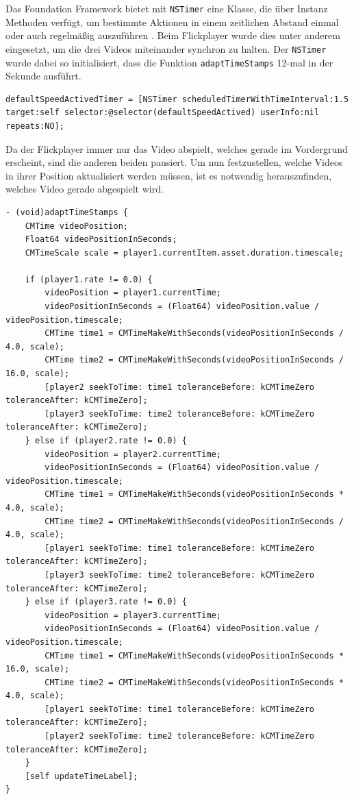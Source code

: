 \documentclass[11pt,a4paper]{report}
\begin{document}
Das Foundation Framework bietet mit \texttt{NSTimer} eine Klasse, die über Instanz Methoden verfügt, um bestimmte Aktionen in einem zeitlichen Abstand einmal oder auch regelmäßig auszuführen \cite{NSTimerClass}. Beim Flickplayer wurde dies unter anderem eingesetzt, um die drei Videos miteinander synchron zu halten. Der \texttt{NSTimer} wurde dabei so initialisiert, dass die Funktion \texttt{adaptTimeStamps} 12-mal in der Sekunde ausführt.
\begin{lstlisting}
defaultSpeedActivedTimer = [NSTimer scheduledTimerWithTimeInterval:1.5 target:self selector:@selector(defaultSpeedActived) userInfo:nil repeats:NO];
\end{lstlisting}
Da der Flickplayer immer nur das Video abspielt, welches gerade im Vordergrund erscheint, sind die anderen beiden pausiert. Um nun festzustellen, welche Videos in ihrer Position aktualisiert werden müssen, ist es notwendig herauszufinden, welches Video gerade abgespielt wird.
\begin{lstlisting}
- (void)adaptTimeStamps {
	CMTime videoPosition;
	Float64 videoPositionInSeconds;
	CMTimeScale scale = player1.currentItem.asset.duration.timescale;
	
	if (player1.rate != 0.0) {
		videoPosition = player1.currentTime; 
		videoPositionInSeconds = (Float64) videoPosition.value / videoPosition.timescale;
		CMTime time1 = CMTimeMakeWithSeconds(videoPositionInSeconds / 4.0, scale);
		CMTime time2 = CMTimeMakeWithSeconds(videoPositionInSeconds / 16.0, scale);
		[player2 seekToTime: time1 toleranceBefore: kCMTimeZero toleranceAfter: kCMTimeZero];
		[player3 seekToTime: time2 toleranceBefore: kCMTimeZero toleranceAfter: kCMTimeZero];        
	} else if (player2.rate != 0.0) {
		videoPosition = player2.currentTime; 
		videoPositionInSeconds = (Float64) videoPosition.value / videoPosition.timescale;
		CMTime time1 = CMTimeMakeWithSeconds(videoPositionInSeconds * 4.0, scale);
		CMTime time2 = CMTimeMakeWithSeconds(videoPositionInSeconds / 4.0, scale);
		[player1 seekToTime: time1 toleranceBefore: kCMTimeZero toleranceAfter: kCMTimeZero];
		[player3 seekToTime: time2 toleranceBefore: kCMTimeZero toleranceAfter: kCMTimeZero];        
	} else if (player3.rate != 0.0) {
		videoPosition = player3.currentTime;  
		videoPositionInSeconds = (Float64) videoPosition.value / videoPosition.timescale;
		CMTime time1 = CMTimeMakeWithSeconds(videoPositionInSeconds * 16.0, scale);
		CMTime time2 = CMTimeMakeWithSeconds(videoPositionInSeconds * 4.0, scale);
		[player1 seekToTime: time1 toleranceBefore: kCMTimeZero toleranceAfter: kCMTimeZero];
		[player2 seekToTime: time2 toleranceBefore: kCMTimeZero toleranceAfter: kCMTimeZero];
	}
	[self updateTimeLabel];
}
\end{lstlisting}
\end{document}
